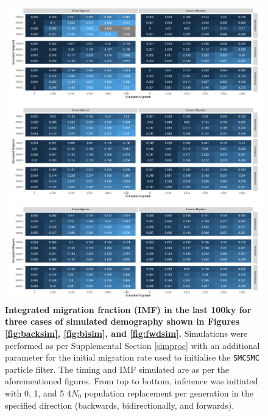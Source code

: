 \documentclass{article}
\begin{document}
\begin{figure}
	\centering
	\includegraphics[width=\textwidth]{plot/all_integrated_sims.pdf}
	\caption{ {\bf Integrated migration fraction (IMF) in the last 100ky for three cases of simulated demography shown in Figures \ref{fig:backsim}, \ref{fig:bisim}, and \ref{fig:fwdsim}.} Simulations were performed as per Supplemental Section \ref{simproc} with an additional parameter for the initial migration rate used to initialise the {\tt SMCSMC} particle filter. The timing and IMF simulated are as per the aforementioned figures. From top to bottom, inference was initiated with 0, 1, and 5 4$N_0$ population replacement per generation in the specified direction (backwards, bidirectionally, and forwards).}
	\label{fig:intsim}
\end{figure}
\end{document}

